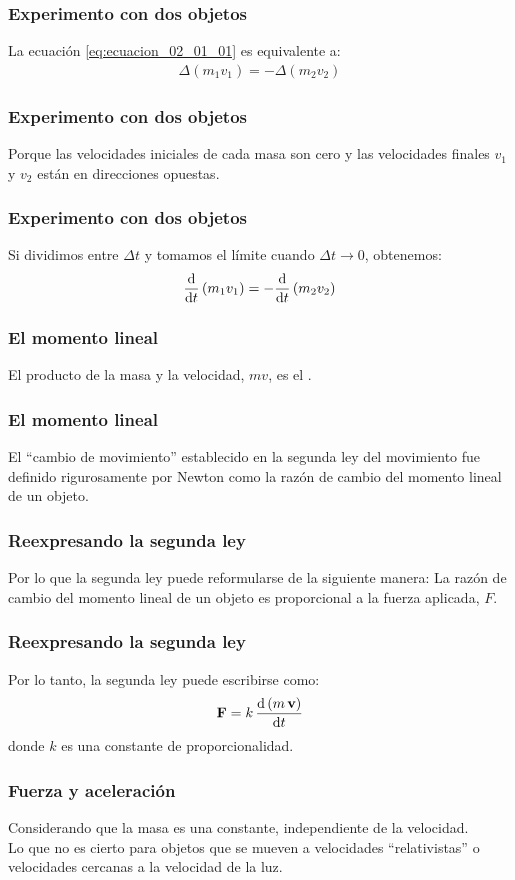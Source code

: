 \documentclass[12pt]{beamer}
\begin{document}
\begin{frame}
\frametitle{Experimento con dos objetos}
La ecuación \ref{eq:ecuacion_02_01_01} es equivalente a:
\pause
\begin{align}
\Delta \left( m_{1} v_{1} \right) = - \Delta \left( m_{2} v_{2} \right) 
\label{eq:ecuacion_02_01_02}
\end{align}
\end{frame}
\begin{frame}
\frametitle{Experimento con dos objetos}
Porque las velocidades iniciales de cada masa son cero y las velocidades finales $v_{1}$ y $v_{2}$ están
en direcciones opuestas.
\end{frame}
\begin{frame}
\frametitle{Experimento con dos objetos}
Si dividimos entre $\Delta t$ y tomamos el límite cuando $\Delta t \to 0$, obtenemos:
\pause
\begin{align}
\dv{t} \left( m_{1} v_{1} \right) = - \dv{t} \left( m_{2} v_{2} \right)
\label{eq:ecuacion_02_01_03}
\end{align}
\end{frame}
\begin{frame}
\frametitle{El momento lineal}
El producto de la masa y la velocidad, $m v$, es el .
\end{frame}
\begin{frame}
\frametitle{El momento lineal}
El \enquote{cambio de movimiento} establecido en la segunda ley del movimiento fue definido rigurosamente por Newton como la razón de cambio del momento lineal de un objeto.
\end{frame}
\begin{frame}
\frametitle{Reexpresando la segunda ley}
Por lo que la segunda ley puede reformularse de la siguiente manera: \pause La razón de cambio del momento lineal de un objeto es proporcional a la fuerza aplicada, $F$.
\end{frame}
\begin{frame}
\frametitle{Reexpresando la segunda ley}
Por lo tanto, la segunda ley puede escribirse como:
\begin{align}
\vb{F} = k \, \dv{\left( m \, \vb{v} \right)}{t}
\label{eq:ecuacion_02_01_04}
\end{align}
donde $k$ es una constante de proporcionalidad.
\end{frame}
\begin{frame}
\frametitle{Fuerza y aceleración}
Considerando que la masa es una constante, independiente de la velocidad.
\\
\bigskip
\pause
Lo que no es cierto para objetos que se mueven a velocidades \enquote{relativistas} o velocidades cercanas a la velocidad de la luz.
\end{frame}
\end{document}
